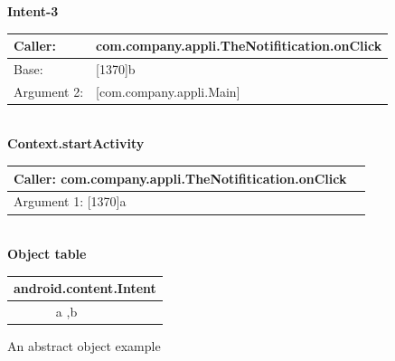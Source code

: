 \begin{figure}
\begin{minipage}{13cm}
\textbf{Intent-3}\\
\begin{tabular}{|l|l|}
\hline
Caller:	& com.company.appli.TheNotifitication.onClick \\ \hline
Base:	& [1370]b \\ \hline
Argument 2:	& [com.company.appli.Main] \\ \hline
\end{tabular}\\[0.5cm]
\textbf{Context.startActivity}\\
\begin{tabular}{|l|l|}
\hline
Caller:	com.company.appli.TheNotifitication.onClick \\ \hline
Argument 1:	[1370]a \\ \hline
\end{tabular}\\[0.5cm]
\textbf{Object table}\\
\begin{tabular}{|l|l|}
\hline
\multicolumn{2}{|c|}{android.content.Intent} \\ \hline
[1370]	& a ,b \\ \hline
\end{tabular}
\end{minipage}
\caption{An abstract object example}
\label{objectImage}
\end{figure}
